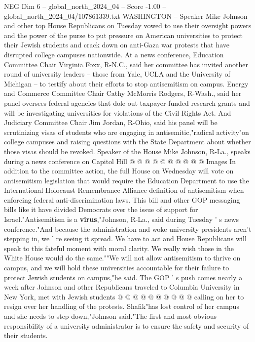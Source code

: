 \begin{textsample}{NEG Dim 6 – global\_north\_2024\_04 – Score -1.00 – global\_north\_2024\_04/107861339.txt}  \label{ex:f6_neg_368}
WASHINGTON -- Speaker Mike Johnson and other top House Republicans on Tuesday vowed to use their oversight powers and the power of the purse to put pressure on American universities to protect their Jewish students and crack down on anti-Gaza war protests that have disrupted college campuses nationwide.
At a news conference, Education Committee Chair Virginia Foxx, R-N.C., said her committee has invited another round of university leaders -- those from Yale, UCLA and the University of Michigan -- to testify about their efforts to stop antisemitism on campus.
Energy and Commerce Committee Chair Cathy McMorris Rodgers, R-Wash., said her panel oversees federal agencies that dole out taxpayer-funded research grants and will be investigating universities for violations of the Civil Rights Act.
And Judiciary Committee Chair Jim Jordan, R-Ohio, said his panel will be scrutinizing visas of students who are engaging in antisemitic,"radical activity"on college campuses and raising questions with the State Department about whether those visas should be revoked.
Speaker of the House Mike Johnson, R-La., speaks during a news conference on Capitol Hill @ @ @ @ @ @ @ @ @ @ Images In addition to the committee action, the full House on Wednesday will vote on antisemitism legislation that would require the Education Department to use the International Holocaust Remembrance Alliance definition of antisemitism when enforcing federal anti-discrimination laws.
This bill and other GOP messaging bills like it have divided Democrats over the issue of support for Israel."Antisemitism is a \textbf{virus},"Johnson, R-La., said during Tuesday ' s news conference."And because the administration and woke university presidents aren't stepping in, we ' re seeing it spread.
We have to act and House Republicans will speak to this fateful moment with moral clarity.
We really wish those in the White House would do the same.""We will not allow antisemitism to thrive on campus, and we will hold these universities accountable for their failure to protect Jewish students on campus,"he said.
The GOP ' s push comes nearly a week after Johnson and other Republicans traveled to Columbia University in New York, met with Jewish students @ @ @ @ @ @ @ @ @ @ calling on her to resign over her handling of the protests.
Shafik"has lost control of her campus and she needs to step down,"Johnson said."The first and most obvious responsibility of a university administrator is to ensure the safety and security of their students.

\end{textsample}
